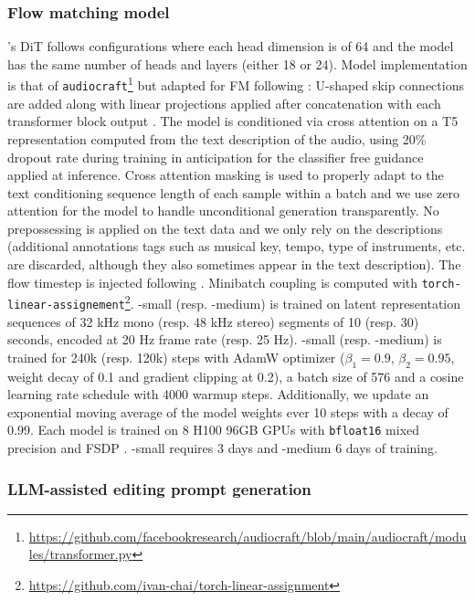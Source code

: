 \subsubsection{Flow matching model}
\label{apx:fm}

\proposed's DiT follows \cite{esser2024scaling} configurations where each head dimension is of 64 and the model has the same number of heads and layers (either 18 or 24).
Model implementation is that of \verb+audiocraft+\footnote{\url{https://github.com/facebookresearch/audiocraft/blob/main/audiocraft/modules/transformer.py}} but adapted for FM following \citet{vyas2023audiobox}: U-shaped skip connections are added along with linear projections applied after concatenation with each transformer block output \cite{Bao_2023_CVPR}.
The model is conditioned via cross attention on a T5 representation \citep{JMLR:v21:20-074} computed from the text description of the audio, using 20\% dropout rate during training in anticipation for the classifier free guidance applied at inference.
Cross attention masking is used to properly adapt to the text conditioning sequence length of each sample within a batch and we use zero attention for the model to handle unconditional generation transparently.
No prepossessing is applied on the text data and we only rely on the descriptions (additional annotations tags such as musical key, tempo, type of instruments, etc. are discarded, although they also sometimes appear in the text description).
The flow timestep is injected following \citet{hatamizadeh2023diffit}. Minibatch coupling is computed with \verb+torch-linear-assignement+\footnote{\url{https://github.com/ivan-chai/torch-linear-assignment}}.
\proposed-small (resp. \proposed-medium) is trained on latent representation sequences of 32 kHz mono (resp. 48 kHz stereo) segments of 10 (resp. 30) seconds, encoded at 20 Hz frame rate (resp. 25 Hz).
\proposed-small (resp. \proposed-medium) is trained for 240k (resp. 120k) steps with AdamW optimizer ($\beta_1=0.9$, $\beta_2=0.95$, weight decay of 0.1 and gradient clipping at 0.2), a batch size of 576 and a cosine learning rate schedule with 4000 warmup steps.
Additionally, we update an exponential moving average of the model weights ever 10 steps with a decay of 0.99.
Each model is trained on 8 H100 96GB GPUs with \verb+bfloat16+ mixed precision and FSDP \citep{zhao2023pytorch}. \proposed-small requires 3 days and \proposed-medium 6 days of training.

\subsubsection{LLM-assisted editing prompt generation}
\label{ref:llm_assist}

